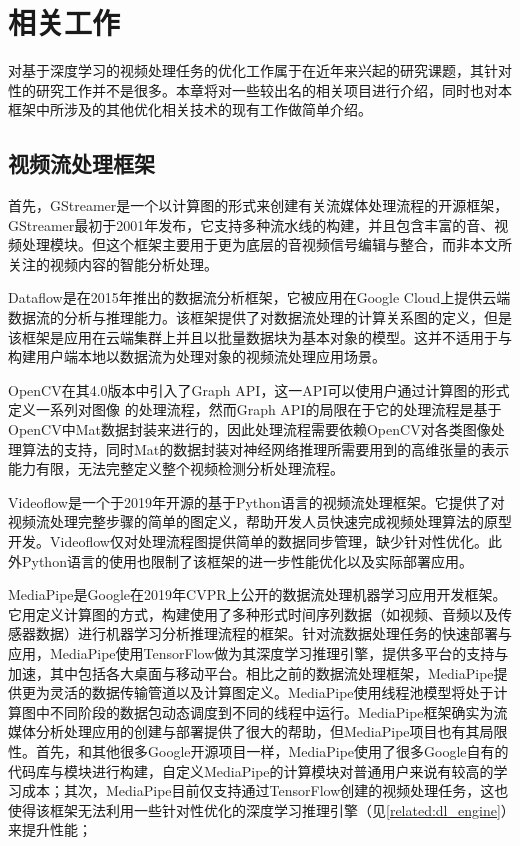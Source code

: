 
\chapter{相关工作}\label{related_work}
对基于深度学习的视频处理任务的优化工作属于在近年来兴起的研究课题，其针对性的研究工作并不是很多。本章将对一些较出名的相关项目进行介绍，同时也对本框架中所涉及的其他优化相关技术的现有工作做简单介绍。

\section{视频流处理框架}\label{ch2:framewk}
首先，GStreamer\cite{gstreamer}是一个以计算图的形式来创建有关流媒体处理流程的开源框架，GStreamer最初于2001年发布，它支持多种流水线的构建，并且包含丰富的音、视频处理模块。但这个框架主要用于更为底层的音视频信号编辑与整合，而非本文所关注的视频内容的智能分析处理。\par
Dataflow\cite{akidau2015dataflow}是在2015年推出的数据流分析框架，它被应用在Google Cloud上提供云端数据流的分析与推理能力。该框架提供了对数据流处理的计算关系图的定义，但是该框架是应用在云端集群上并且以批量数据块为基本对象的模型。这并不适用于与构建用户端本地以数据流为处理对象的视频流处理应用场景。\par 
OpenCV在其4.0版本中引入了Graph API\cite{matveev2018opencv}，这一API可以使用户通过计算图的形式定义一系列对图像
的处理流程，然而Graph API的局限在于它的处理流程是基于OpenCV中Mat数据封装来进行的，因此处理流程需要依赖OpenCV对各类图像处理算法的支持，同时Mat的数据封装对神经网络推理所需要用到的高维张量的表示能力有限，无法完整定义整个视频检测分析处理流程。\par
Videoflow\cite{deArmas2019videoflow}是一个于2019年开源的基于Python语言的视频流处理框架。它提供了对视频流处理完整步骤的简单的图定义，帮助开发人员快速完成视频处理算法的原型开发。Videoflow仅对处理流程图提供简单的数据同步管理，缺少针对性优化。此外Python语言的使用也限制了该框架的进一步性能优化以及实际部署应用。\par
MediaPipe\cite{lugaresi2019mediapipe}是Google在2019年CVPR上公开的数据流处理机器学习应用开发框架。
它用定义计算图的方式，构建使用了多种形式时间序列数据（如视频、音频以及传感器数据）进行机器学习分析推理流程的框架。针对流数据处理任务的快速部署与应用，MediaPipe使用TensorFlow\cite{abadi2016tensorflow}做为其深度学习推理引擎，提供多平台的支持与加速，其中包括各大桌面与移动平台。相比之前的数据流处理框架，MediaPipe提供更为灵活的数据传输管道以及计算图定义。MediaPipe使用线程池模型将处于计算图中不同阶段的数据包动态调度到不同的线程中运行。MediaPipe框架确实为流媒体分析处理应用的创建与部署提供了很大的帮助，但MediaPipe项目也有其局限性。首先，和其他很多Google开源项目一样，MediaPipe使用了很多Google自有的代码库与模块进行构建，自定义MediaPipe的计算模块对普通用户来说有较高的学习成本；其次，MediaPipe目前仅支持通过TensorFlow创建的视频处理任务，这也使得该框架无法利用一些针对性优化的深度学习推理引擎（见\ref{related:dl_engine}）来提升性能；
